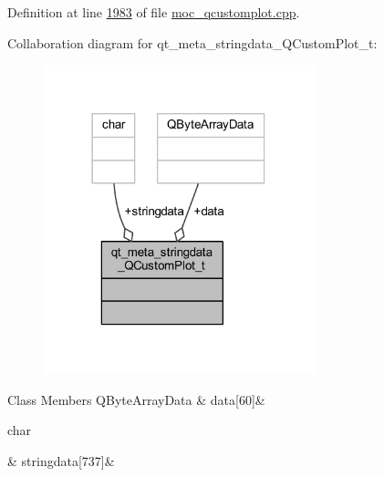 Definition at line \hyperlink{a00067_source_l01983}{1983} of file \hyperlink{a00067_source}{moc\+\_\+qcustomplot.\+cpp}.



Collaboration diagram for qt\+\_\+meta\+\_\+stringdata\+\_\+\+Q\+Custom\+Plot\+\_\+t\+:
\nopagebreak
\begin{figure}[H]
\begin{center}
\leavevmode
\includegraphics[width=222pt]{d1/d67/a00310}
\end{center}
\end{figure}
\begin{DoxyFields}{Class Members}
\hypertarget{a00067_a294e0b700c66ea0a3f528f255fa52fff}{Q\+Byte\+Array\+Data}\label{a00067_a294e0b700c66ea0a3f528f255fa52fff}
&
data\mbox{[}60\mbox{]}&
\\
\hline

\hypertarget{a00067_a06c7bf819765fdc7a40739cfb2bb681c}{char}\label{a00067_a06c7bf819765fdc7a40739cfb2bb681c}
&
stringdata\mbox{[}737\mbox{]}&
\\
\hline

\end{DoxyFields}


